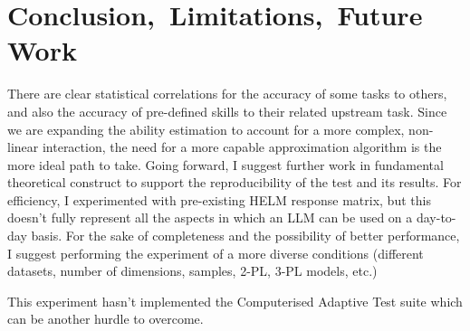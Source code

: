 \section{\mbox{Conclusion, Limitations, Future Work}}
There are clear statistical correlations for the accuracy of some tasks to others, and also the accuracy of pre-defined skills to their related upstream task. Since we are expanding the ability estimation to account for a more complex, non-linear interaction, the need for a more capable approximation algorithm is the more ideal path to take. Going forward, I suggest further work in fundamental theoretical construct to support the reproducibility of the test and its results. For efficiency, I experimented with pre-existing HELM response matrix, but this doesn't fully represent all the aspects in which an LLM can be used on a day-to-day basis. For the sake of completeness and the possibility of better performance, I suggest performing the experiment of a more diverse conditions (different datasets, number of dimensions, samples, 2-PL, 3-PL models, etc.)

This experiment hasn't implemented the Computerised Adaptive Test suite which can be another hurdle to overcome.